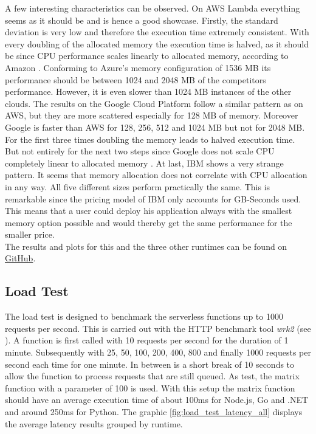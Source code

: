 A few interesting characteristics can be observed. On \gls{AWS} Lambda everything seems as it should be and is hence a good showcase. Firstly, the standard deviation is very low and therefore the execution time extremely consistent. With every doubling of the allocated memory the execution time is halved, as it should be since \gls{CPU} performance scales linearly to allocated memory, according to Amazon \cite{AWSLambdaConfig}. Conforming to Azure's memory configuration of 1536 \gls{MB} its performance should be between 1024 and 2048 \gls{MB} of the competitors performance. However, it is even slower than 1024 \gls{MB} instances of the other clouds. The results on the Google Cloud Platform follow a similar pattern as on \gls{AWS}, but they are more scattered especially for 128 \gls{MB} of memory. Moreover Google is faster than \gls{AWS} for 128, 256, 512 and 1024 \gls{MB} but not for 2048 \gls{MB}. For the first three times doubling the memory leads to halved execution time. But not entirely for the next two steps since Google does not scale \gls{CPU} completely linear to allocated memory \cite{GoogleFunctionsPricing}. At last, \gls{IBM} shows a very strange pattern. It seems that memory allocation does not correlate with \gls{CPU} allocation in any way. All five different sizes perform practically the same. This is remarkable since the pricing model of \gls{IBM} only accounts for GB-Seconds used. This means that a user could deploy his application always with the smallest memory option possible and would thereby get the same performance for the smaller price.\\
The results and plots for this and the three other runtimes can be found on \href{https://github.com/Bschitter/benchmark-suite-serverless-computing/tree/master/results/3-general}{GitHub}.

\newpage
\subsection{Load Test}
\label{sec:loadtest}
The load test is designed to benchmark the serverless functions up to 1000 requests per second. This is carried out with the \gls{HTTP} benchmark tool \textit{wrk2} (see \cite{wrk2}). A function is first called with 10 requests per second for the duration of 1 minute. Subsequently with 25, 50, 100, 200, 400, 800 and finally 1000 requests per second each time for one minute. In between is a short break of 10 seconds to allow the function to process requests that are still queued. As test, the matrix function with a parameter of 100 is used. With this setup the matrix function should have an average execution time of about 100ms for Node.js, Go and .NET and around 250ms for Python. The graphic \ref{fig:load_test_latency_all} displays the average latency results grouped by runtime.


